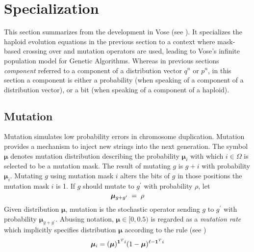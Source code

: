 \section{Specialization}\label{specialize}
This section summarizes from the development in Vose (see \cite{Vose1999}).
It specializes the haploid evolution equations in the previous section 
to a context where mask-based crossing over and mutation operators are used, 
leading to Vose's infinite population model for Genetic Algorithms.  Whereas 
in previous sections {\em component} referred to a component
of a distribution vector $q^n$ or $p^n$, in this section a component
is either a probability (when speaking of a component of a
distribution vector), or a bit (when speaking of a component of a
haploid).

\subsection{Mutation}
Mutation simulates low probability errors in chromosome duplication. 
Mutation provides a mechanism to inject new strings into the next generation.
The symbol $\bm{\mu}$ denotes mutation distribution describing 
the probability $\bm{\mu}_i$ with which $i \in \Omega$ is selected to be a mutation mask. 
The result of mutating $g$ is $g + i$ with probability $\bm{\mu}_i$. 
Mutating $g$ using mutation mask $i$ alters the bits of $g$ in those positions the mutation mask $i$ is 1. 
If $g$ should mutate to $g^\prime$ with probability $\rho$,
let\\[-0.2in]
\[
\bm{\mu}_{g + g^\prime} \; = \; \rho\\[0.05in]
\]
Given distribution $\bm{\mu}$, mutation is the stochastic operator sending
$g$ to $g^\prime$ with probability $\bm{\mu}_{g + g^\prime}$.
Abusing notation, $\bm{\mu} \in [0, 0.5)$ is regarded as a {\em mutation rate} which implicitly 
specifies distribution $\bm{\mu}$ according to the rule (see \cite{VoseWright1998})
\[
\bm{\mu}_i = (\bm{\mu})^{{\bf 1}^Ti} (1-\bm{\mu})^{\ell- {\bf 1}^Ti}
\]

